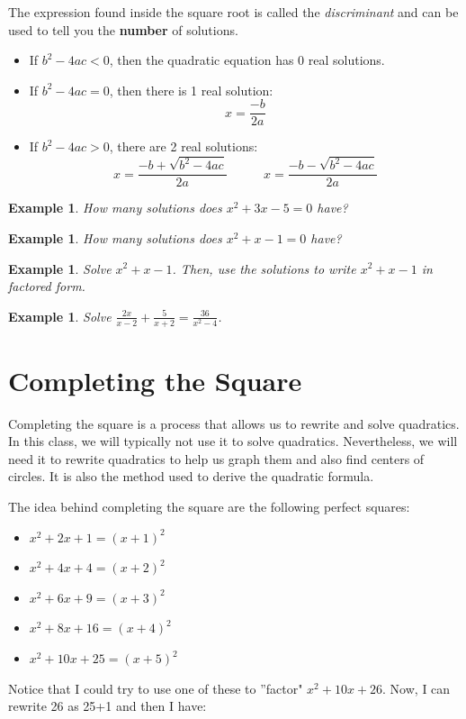 \documentclass[twoside]{tufte-handout}
\newcounter{ekcounter}%
\theoremstyle{ekimcustom}
\newtheorem{exm}[ekcounter]{Example}
\begin{document}
The expression  found inside the square root is called the {\it discriminant} and can be used to tell you the \textbf{number} of solutions.     
\begin{itemize}
\item If $b^2-4ac<0$, then the quadratic equation has 0 real solutions. 
			\item   If $b^2-4ac=0$, then there is 1 real solution:$$x=\frac{-b}{2a}$$
		\item  If $b^2-4ac>0$, there are 2 real solutions:$$x=\frac{-b+\sqrt{b^2-4ac}}{2a}~~~~~~~~~~~~~x=\frac{-b-\sqrt{b^2-4ac}}{2a}$$
\end{itemize}	

\everymath{\displaystyle}
\begin{exm}{}How many solutions does $x^2+3x-5=0$ have?
\end{exm}\vskip10pt

\everymath{\displaystyle}
\begin{exm}{}How many solutions does $x^2+x-1=0$ have?
\end{exm}\vskip10pt

\everymath{\displaystyle}
\begin{exm}{}Solve $x^2+x-1$. Then, use the solutions to write $x^2+x-1$ in factored form.
\end{exm}\vskip10pt

\everymath{\displaystyle}
\begin{exm}{}Solve $\frac{2x}{x-2}+\frac{5}{x+2}=\frac{36}{x^2-4}$.
\end{exm}\vskip10pt

\section{Completing the Square}
Completing the square is a process that allows us to rewrite and solve quadratics. In this class, we will typically not use it to solve quadratics. Nevertheless, we will need it to rewrite quadratics to help us graph them and also find centers of circles. It is also the method used to derive the quadratic formula.

The idea behind completing the square are the following perfect squares:
\begin{itemize}
	\item   $x^2+2x+1=(x+1)^2$ 
	\item   $x^2+4x+4=(x+2)^2$  
		\item  $x^2+6x+9=(x+3)^2$ 
		\item   $x^2+8x+16=(x+4)^2$ 
	\item   $x^2+10x+25=(x+5)^2$ 
 \end{itemize}	
Notice that I could try to use one of these to ''factor" $x^2+10x+26$. Now, I can rewrite 26 as 25+1 and then I have: 
\end{document}
